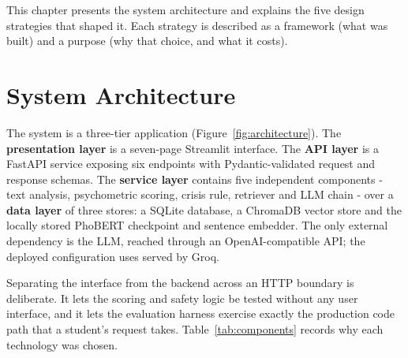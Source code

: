This chapter presents the system architecture and explains the five design strategies that shaped it. Each strategy is described as a framework (what was built) and a purpose (why that choice, and what it costs).

\section{System Architecture}
The system is a three-tier application (Figure~\ref{fig:architecture}). The \textbf{presentation layer} is a seven-page Streamlit interface. The \textbf{API layer} is a FastAPI service exposing six endpoints with Pydantic-validated request and response schemas. The \textbf{service layer} contains five independent components - text analysis, psychometric scoring, crisis rule, retriever and LLM chain - over a \textbf{data layer} of three stores: a SQLite database, a ChromaDB vector store and the locally stored PhoBERT checkpoint and sentence embedder. The only external dependency is the LLM, reached through an OpenAI-compatible API; the deployed configuration uses  served by Groq.


Separating the interface from the backend across an HTTP boundary is deliberate. It lets the scoring and safety logic be tested without any user interface, and it lets the evaluation harness exercise exactly the production code path that a student's request takes. Table~\ref{tab:components} records why each technology was chosen.

